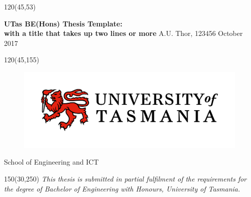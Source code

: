 \begin{textblock}{120}(45,53) %
\noindent\begin{minipage}[t][55mm][c]{\textwidth} 
\centering \Large  %
\vspace*{\fill}
{\bf UTas BE(Hons) Thesis Template:\\ with a title that takes up two lines or more}
\vfill
A.U. Thor, 123456 
\vfill
\large October 2017
\vspace*{\fill}
\end{minipage}
\end{textblock}

\begin{textblock}{120}(45,155)
\centering
\begin{figure}[h]
\centering\includegraphics[width=0.75\linewidth]{UTAS-Logo-colour-2018.jpg}
\end{figure}
\vspace{2cm}
\Large
School of Engineering and ICT


\end{textblock}


\begin{textblock}{150}(30,250)
\centering
\emph{This thesis is submitted in partial fulfilment of the requirements for the degree of
Bachelor of Engineering with Honours,
University of Tasmania.}
\end{textblock}



\null\cleardoublepage
{}
